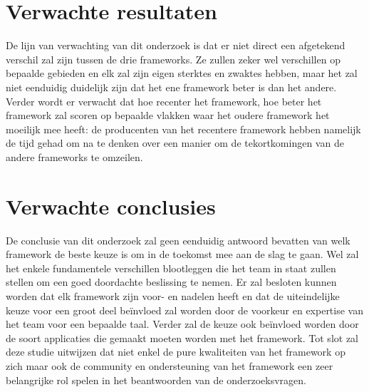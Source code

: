 \section{Verwachte resultaten}
\label{sec:verwachte_resultaten}

De lijn van verwachting van dit onderzoek is dat er niet direct een afgetekend verschil zal zijn tussen de drie frameworks. Ze zullen zeker wel verschillen op bepaalde gebieden en elk zal zijn eigen sterktes en zwaktes hebben, maar het zal niet eenduidig duidelijk zijn dat het ene framework beter is dan het andere. Verder wordt er verwacht dat hoe recenter het framework, hoe beter het framework zal scoren op bepaalde vlakken waar het oudere framework het moeilijk mee heeft: de producenten van het recentere framework hebben namelijk de tijd gehad om na te denken over een manier om de tekortkomingen van de andere frameworks te omzeilen.

\section{Verwachte conclusies}
\label{sec:verwachte_conclusies}

De conclusie van dit onderzoek zal geen eenduidig antwoord bevatten van welk framework de beste keuze is om in de toekomst mee aan de slag te gaan. Wel zal het enkele fundamentele verschillen blootleggen die het team in staat zullen stellen om een goed doordachte beslissing te nemen. Er zal besloten kunnen worden dat elk framework zijn voor- en nadelen heeft en dat de uiteindelijke keuze voor een groot deel beïnvloed zal worden door de voorkeur en expertise van het team voor een bepaalde taal. Verder zal de keuze ook beïnvloed worden door de soort applicaties die gemaakt moeten worden met het framework. Tot slot zal deze studie uitwijzen dat niet enkel de pure kwaliteiten van het framework op zich maar ook de community en ondersteuning van het framework een zeer belangrijke rol spelen in het beantwoorden van de onderzoeksvragen.

